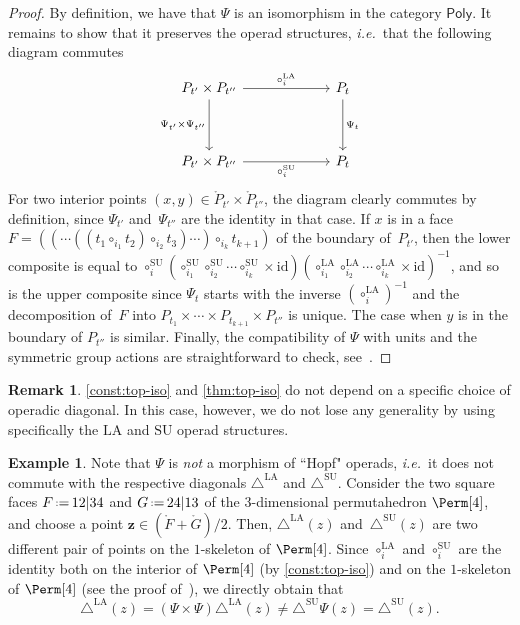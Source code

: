 \documentclass{amsart}
\theoremstyle{definition}
\newtheorem{example}[theorem]{Example}
\newtheorem{remark}[theorem]{Remark}
\renewcommand{\b}[1]{{\boldsymbol{#1}}} %
\newcommand{\eqdef}{\mbox{\,\raisebox{0.2ex}{\scriptsize\ensuremath{\mathrm:}}\ensuremath{=}\,}} %
\newcommand{\ie}{\textit{i.e.}~} %
\renewcommand{\b}[1]{\boldsymbol{#1}} %
\newcommand{\SU}{\mathrm{SU}}
\newcommand{\LA}{\mathrm{LA}}
\newcommand{\SUD}{\triangle^{\mathrm{SU}}}
\newcommand{\LAD}{\triangle^{\mathrm{LA}}}
\newcommand{\PolySub}{\mathsf{Poly}}
\newcommand{\id}{\mathrm{id}}
\begin{document}
\begin{proof}
By definition, we have that $\Psi$ is an isomorphism in the category $\PolySub$. 
It remains to show that it preserves the operad structures, \ie that the following diagram commutes
\[
\vcenter{\hbox{
\begin{tikzcd}[column sep=2.2cm, row sep=1.3cm]
P_{t'}\times P_{t''}
\arrow[r,  "\circ_i^\LA"] 
\arrow[d,  "\Psi_{t'}\times\Psi_{t''}"']
& P_{t} \arrow[d,  "\Psi_t"] \\
P_{t'}\times P_{t''}  
\arrow[r,  "\circ_i^\SU"']
& P_{t}
\end{tikzcd}
}}\]
For two interior points $(x,y) \in \mathring P_{t'}\times \mathring P_{t''}$, the diagram clearly commutes by definition, since $\Psi_{t'}$ and~$\Psi_{t''}$ are the identity in that case. 
If $x$ is in a face $F=((\cdots((t_1 \circ_{i_1} t_2) \circ_{i_2} t_3) \cdots )\circ_{i_k} t_{k+1})$ of the boundary of~$P_{t'}$, then the lower composite is equal to $\circ_i^\SU (\circ_{i_1}^\SU \circ_{i_2}^\SU \cdots \circ_{i_k}^\SU \times \id)(\circ_{i_1}^\LA \circ_{i_2}^\LA \cdots \circ_{i_k}^\LA \times \id)^{-1}$, and so is the upper composite since $\Psi_t$ starts with the inverse $(\circ_i^\LA)^{-1}$ and the decomposition of~$F$ into $P_{t_1} \times \cdots \times P_{t_{k+1}} \times P_{t''}$ is unique.
The case when $y$ is in the boundary of $P_{t''}$ is similar.  
Finally, the compatibility of $\Psi$ with units and the symmetric group actions are straightforward to check, see~\cite[Def.~4.17 \& Thm.~4.18]{LaplanteAnfossi}.
\end{proof}

\begin{remark}
\cref{const:top-iso} and \cref{thm:top-iso} do not depend on a specific choice of operadic diagonal.
In this case, however, we do not lose any generality by using specifically the $\LA$ and $\SU$ operad structures. 
\end{remark}

\begin{example}
\label{ex:iso-not-Hopf}
Note that $\Psi$ is \emph{not} a morphism of ``Hopf" operads, \ie it does not commute with the respective diagonals $\LAD$ and $\SUD$. 
Consider the two square faces $F \eqdef 12|34$ and $G \eqdef 24|13$ of the $3$-dimensional permutahedron $\Perm[4]$, and choose a point $\b z \in (\mathring F + \mathring G)/2$.
Then, $\LAD(z)$ and~$\SUD(z)$ are two different pair of points on the $1$-skeleton of $\Perm[4]$. 
Since $\circ_i^\LA$ and $\circ_i^\SU$ are the identity both on the interior of $\Perm[4]$ (by \cref{const:top-iso}) and on the $1$-skeleton of $\Perm[4]$ (see the proof of~\cite[Prop. 7]{MasudaThomasTonksVallette}), we directly obtain that
\[
{\LAD(z)=(\Psi \times \Psi)\LAD(z) \neq \SUD \Psi(z)=\SUD(z)}.
\] 
\end{example}
\end{document}

